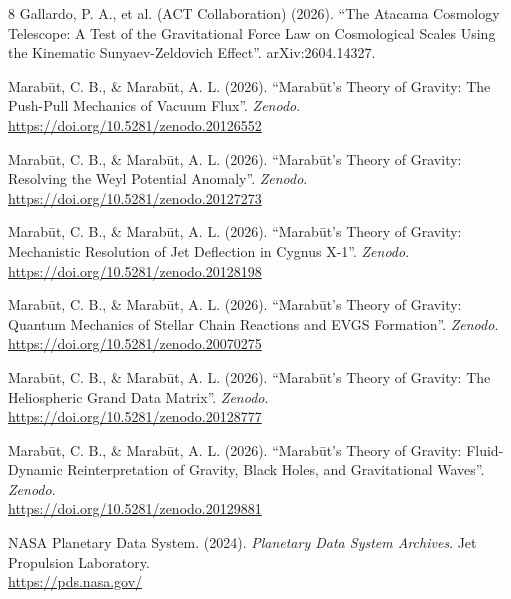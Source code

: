 \documentclass[11pt, a4paper]{article}
\begin{document}
\clearpage
\begin{thebibliography}{8}
  Gallardo, P. A., et al. (ACT Collaboration) (2026). ``The Atacama Cosmology Telescope: A Test of the Gravitational Force Law on Cosmological Scales Using the Kinematic Sunyaev-Zeldovich Effect''. arXiv:2604.14327.

  Marab\={u}t, C. B., \& Marab\={u}t, A. L. (2026). ``Marab\={u}t's Theory of Gravity: The Push-Pull Mechanics of Vacuum Flux''. \textit{Zenodo}. \\
  \url{https://doi.org/10.5281/zenodo.20126552}

  Marab\={u}t, C. B., \& Marab\={u}t, A. L. (2026). ``Marab\={u}t's Theory of Gravity: Resolving the Weyl Potential Anomaly''. \textit{Zenodo}. \\
  \url{https://doi.org/10.5281/zenodo.20127273}

  Marab\={u}t, C. B., \& Marab\={u}t, A. L. (2026). ``Marab\={u}t's Theory of Gravity: Mechanistic Resolution of Jet Deflection in Cygnus X-1''. \textit{Zenodo}. \\
  \url{https://doi.org/10.5281/zenodo.20128198}

  Marab\={u}t, C. B., \& Marab\={u}t, A. L. (2026). ``Marab\={u}t's Theory of Gravity: Quantum Mechanics of Stellar Chain Reactions and EVGS Formation''. \textit{Zenodo}. \\
  \url{https://doi.org/10.5281/zenodo.20070275}

  Marab\={u}t, C. B., \& Marab\={u}t, A. L. (2026). ``Marab\={u}t's Theory of Gravity: The Heliospheric Grand Data Matrix''. \textit{Zenodo}. \\
  \url{https://doi.org/10.5281/zenodo.20128777}

  Marab\={u}t, C. B., \& Marab\={u}t, A. L. (2026). ``Marab\={u}t's Theory of Gravity: Fluid-Dynamic Reinterpretation of Gravity, Black Holes, and Gravitational Waves''. \textit{Zenodo}. \\
  \url{https://doi.org/10.5281/zenodo.20129881}

  NASA Planetary Data System. (2024). \textit{Planetary Data System Archives}. Jet Propulsion Laboratory. \\
  \url{https://pds.nasa.gov/}

\end{thebibliography}
\end{document}
